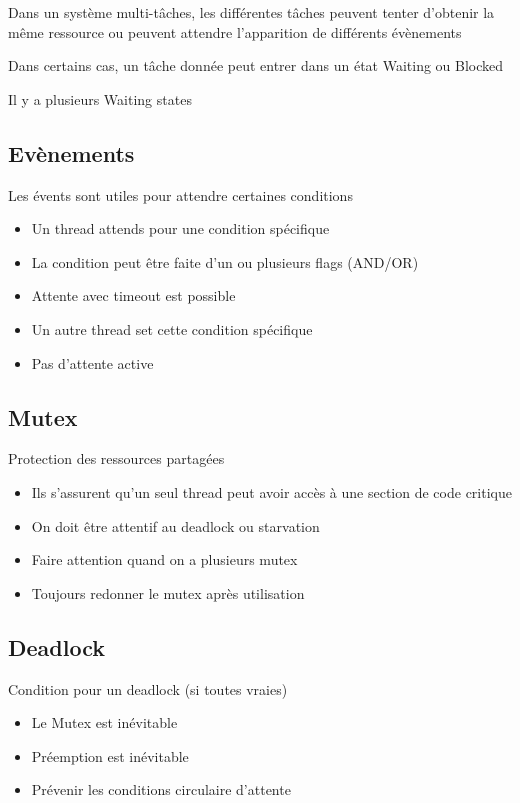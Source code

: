 \documentclass[resume]{subfiles}
\begin{document}
Dans un système multi-tâches, les différentes tâches peuvent tenter d'obtenir la même ressource ou peuvent attendre l'apparition de différents évènements

Dans certains cas, un tâche donnée peut entrer dans un état Waiting ou Blocked

Il y a plusieurs Waiting states

\subsection{Evènements}

Les évents sont utiles pour attendre certaines conditions
\begin{itemize}
\item Un thread attends pour une condition spécifique 
  \item La condition peut être faite d'un ou plusieurs flags (AND/OR)
  \item Attente avec timeout est possible

\item Un autre thread set cette condition spécifique
\item Pas d'attente active
\end{itemize}

\subsection{Mutex}

Protection des ressources partagées
\begin{itemize}
\item Ils s'assurent qu'un seul thread peut avoir accès à une section de code critique
\item On doit être attentif au deadlock ou starvation
  \item Faire attention quand on a plusieurs mutex
  \item Toujours redonner le mutex après utilisation
\end{itemize}

\subsection{Deadlock}

Condition pour un deadlock (si toutes vraies)
\begin{itemize}
\item Le Mutex est inévitable
\item Préemption est inévitable
\item Prévenir les conditions circulaire d'attente
\end{itemize}
\end{document}
